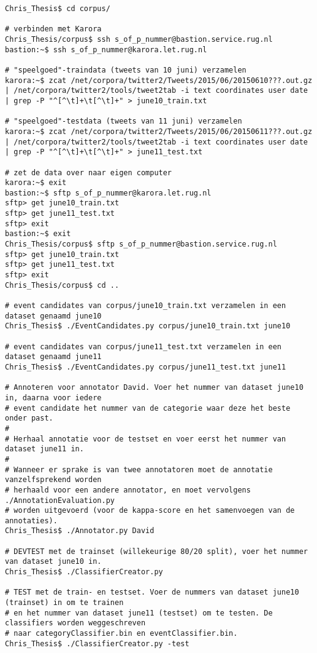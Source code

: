{{\begin{lstlisting}
Chris_Thesis$ cd corpus/

# verbinden met Karora
Chris_Thesis/corpus$ ssh s_of_p_nummer@bastion.service.rug.nl
bastion:~$ ssh s_of_p_nummer@karora.let.rug.nl

# "speelgoed"-traindata (tweets van 10 juni) verzamelen
karora:~$ zcat /net/corpora/twitter2/Tweets/2015/06/20150610???.out.gz | /net/corpora/twitter2/tools/tweet2tab -i text coordinates user date | grep -P "^[^\t]+\t[^\t]+" > june10_train.txt

# "speelgoed"-testdata (tweets van 11 juni) verzamelen
karora:~$ zcat /net/corpora/twitter2/Tweets/2015/06/20150611???.out.gz | /net/corpora/twitter2/tools/tweet2tab -i text coordinates user date | grep -P "^[^\t]+\t[^\t]+" > june11_test.txt

# zet de data over naar eigen computer
karora:~$ exit
bastion:~$ sftp s_of_p_nummer@karora.let.rug.nl
sftp> get june10_train.txt 
sftp> get june11_test.txt
sftp> exit
bastion:~$ exit
Chris_Thesis/corpus$ sftp s_of_p_nummer@bastion.service.rug.nl
sftp> get june10_train.txt 
sftp> get june11_test.txt
sftp> exit
Chris_Thesis/corpus$ cd ..

# event candidates van corpus/june10_train.txt verzamelen in een dataset genaamd june10
Chris_Thesis$ ./EventCandidates.py corpus/june10_train.txt june10

# event candidates van corpus/june11_test.txt verzamelen in een dataset genaamd june11
Chris_Thesis$ ./EventCandidates.py corpus/june11_test.txt june11

# Annoteren voor annotator David. Voer het nummer van dataset june10 in, daarna voor iedere 
# event candidate het nummer van de categorie waar deze het beste onder past. 
#
# Herhaal annotatie voor de testset en voer eerst het nummer van dataset june11 in. 
#
# Wanneer er sprake is van twee annotatoren moet de annotatie vanzelfsprekend worden 
# herhaald voor een andere annotator, en moet vervolgens ./AnnotationEvaluation.py 
# worden uitgevoerd (voor de kappa-score en het samenvoegen van de annotaties).
Chris_Thesis$ ./Annotator.py David

# DEVTEST met de trainset (willekeurige 80/20 split), voer het nummer van dataset june10 in.
Chris_Thesis$ ./ClassifierCreator.py

# TEST met de train- en testset. Voer de nummers van dataset june10 (trainset) in om te trainen
# en het nummer van dataset june11 (testset) om te testen. De classifiers worden weggeschreven 
# naar categoryClassifier.bin en eventClassifier.bin.
Chris_Thesis$ ./ClassifierCreator.py -test


\end{lstlisting}}}

